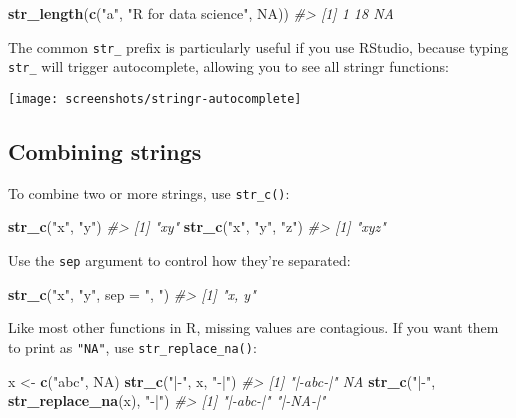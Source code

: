 \documentclass[]{book}
\newenvironment{Shaded}{\begin{snugshade}}{\end{snugshade}}
\newcommand{\KeywordTok}[1]{\textcolor[rgb]{0.13,0.29,0.53}{\textbf{{#1}}}}
\newcommand{\DataTypeTok}[1]{\textcolor[rgb]{0.13,0.29,0.53}{{#1}}}
\newcommand{\StringTok}[1]{\textcolor[rgb]{0.31,0.60,0.02}{{#1}}}
\newcommand{\CommentTok}[1]{\textcolor[rgb]{0.56,0.35,0.01}{\textit{{#1}}}}
\newcommand{\OtherTok}[1]{\textcolor[rgb]{0.56,0.35,0.01}{{#1}}}
\newcommand{\NormalTok}[1]{{#1}}
\begin{document}
\begin{Shaded}
\begin{Highlighting}[]
\KeywordTok{str_length}\NormalTok{(}\KeywordTok{c}\NormalTok{(}\StringTok{"a"}\NormalTok{, }\StringTok{"R for data science"}\NormalTok{, }\OtherTok{NA}\NormalTok{))}
\CommentTok{#> [1]  1 18 NA}
\end{Highlighting}
\end{Shaded}

The common \texttt{str\_} prefix is particularly useful if you use
RStudio, because typing \texttt{str\_} will trigger autocomplete,
allowing you to see all stringr functions:

\begin{center}\texttt{[image: screenshots/stringr-autocomplete]} \end{center}

\subsection{Combining strings}\label{combining-strings}

To combine two or more strings, use \texttt{str\_c()}:

\begin{Shaded}
\begin{Highlighting}[]
\KeywordTok{str_c}\NormalTok{(}\StringTok{"x"}\NormalTok{, }\StringTok{"y"}\NormalTok{)}
\CommentTok{#> [1] "xy"}
\KeywordTok{str_c}\NormalTok{(}\StringTok{"x"}\NormalTok{, }\StringTok{"y"}\NormalTok{, }\StringTok{"z"}\NormalTok{)}
\CommentTok{#> [1] "xyz"}
\end{Highlighting}
\end{Shaded}

Use the \texttt{sep} argument to control how they're separated:

\begin{Shaded}
\begin{Highlighting}[]
\KeywordTok{str_c}\NormalTok{(}\StringTok{"x"}\NormalTok{, }\StringTok{"y"}\NormalTok{, }\DataTypeTok{sep =} \StringTok{", "}\NormalTok{)}
\CommentTok{#> [1] "x, y"}
\end{Highlighting}
\end{Shaded}

Like most other functions in R, missing values are contagious. If you
want them to print as \texttt{"NA"}, use \texttt{str\_replace\_na()}:

\begin{Shaded}
\begin{Highlighting}[]
\NormalTok{x <-}\StringTok{ }\KeywordTok{c}\NormalTok{(}\StringTok{"abc"}\NormalTok{, }\OtherTok{NA}\NormalTok{)}
\KeywordTok{str_c}\NormalTok{(}\StringTok{"|-"}\NormalTok{, x, }\StringTok{"-|"}\NormalTok{)}
\CommentTok{#> [1] "|-abc-|" NA}
\KeywordTok{str_c}\NormalTok{(}\StringTok{"|-"}\NormalTok{, }\KeywordTok{str_replace_na}\NormalTok{(x), }\StringTok{"-|"}\NormalTok{)}
\CommentTok{#> [1] "|-abc-|" "|-NA-|"}
\end{Highlighting}
\end{Shaded}
\end{document}
